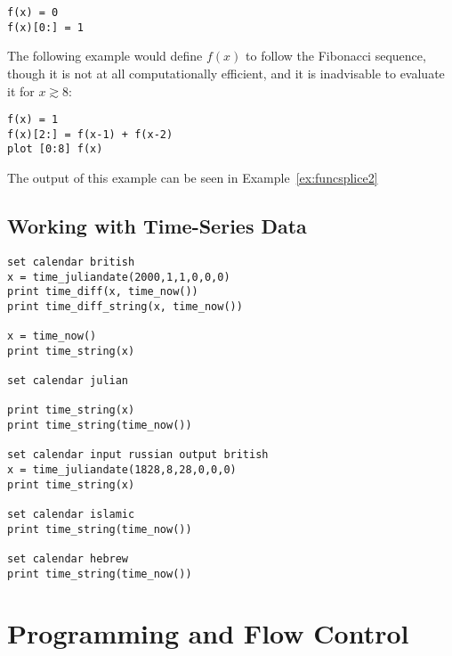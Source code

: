 \begin{verbatim}
f(x) = 0
f(x)[0:] = 1
\end{verbatim}

\noindent The following example would define $f(x)$ to follow the Fibonacci
sequence, though it is not at all computationally efficient, and it is
inadvisable to evaluate it for $x\gtrsim8$:

\begin{verbatim}
f(x) = 1
f(x)[2:] = f(x-1) + f(x-2)
plot [0:8] f(x)
\end{verbatim}


\noindent The output of this example can be seen in Example~\ref{ex:funcsplice2}

\section{Working with Time-Series Data}
\label{sec:time_series}

\begin{verbatim}
set calendar british
x = time_juliandate(2000,1,1,0,0,0)
print time_diff(x, time_now())
print time_diff_string(x, time_now())

x = time_now()
print time_string(x)

set calendar julian

print time_string(x)
print time_string(time_now())

set calendar input russian output british
x = time_juliandate(1828,8,28,0,0,0)
print time_string(x)

set calendar islamic
print time_string(time_now())

set calendar hebrew
print time_string(time_now())
\end{verbatim}



\chapter{Programming and Flow Control}

